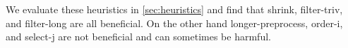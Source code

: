 We evaluate these heuristics in \autoref{sec:heuristics} and find that
\textsf{shrink}, \textsf{filter-triv}, and \textsf{filter-long} are all
beneficial. On the other hand \textsf{longer-preprocess}, \textsf{order-i}, and
\textsf{select-j} are not beneficial and can sometimes be harmful.








